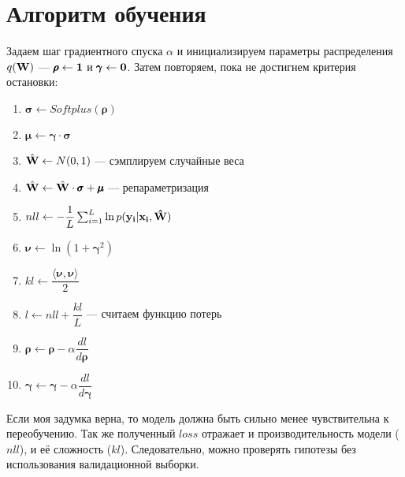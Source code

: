 \documentclass{article}
\begin{document}
\section{Алгоритм обучения}
Задаем шаг градиентного спуска $\alpha$ и инициализируем параметры распределения $q(\bold{W})$ — $\pmb{\rho} \leftarrow \bold{1}$ и $\pmb{\gamma} \leftarrow \bold{0}$. Затем повторяем, пока не достигнем критерия остановки:
\begin{enumerate}
    \item $\pmb{\sigma} \leftarrow Softplus(\pmb{\rho})$
    \item $\pmb{\mu} \leftarrow \pmb{\gamma} \cdot \pmb{\sigma}$
    \item $\hat{\bold{W}} \leftarrow N(0, 1)$ — сэмплируем случайные веса
    \item $\hat{\bold{W}} \leftarrow \hat{\bold{W}} \cdot \pmb{\sigma} + \pmb{\mu}$ — репараметризация
    \item $nll \leftarrow -\dfrac{1}{L}\sum_{i=1}^{L}{\ln{p( \bold{y_{i}} | \bold{x_{i}}, \bold{\hat{W}})}}$
    \item $\pmb{\nu} \leftarrow \ln{(1 + \pmb{\gamma}^2)}$
    \item $kl \leftarrow \dfrac{\langle  \pmb{\nu}, \pmb{\nu} \rangle}{2}$
    \item $l \leftarrow nll + \dfrac{kl}{L}$ — считаем функцию потерь
    \item $\pmb{\rho} \leftarrow \pmb{\rho} - \alpha \dfrac{d l}{d \pmb{\rho}}$
    \item $\pmb{\gamma} \leftarrow \pmb{\gamma} - \alpha \dfrac{d l}{d \pmb{\gamma}}$
\end{enumerate}

Если моя задумка верна, то модель должна быть сильно менее чувствительна к переобучению. Так же полученный $loss$ отражает и производительность модели ($nll$), и её сложность ($kl$). Следовательно, можно проверять гипотезы без использования валидационной выборки.
\end{document}
